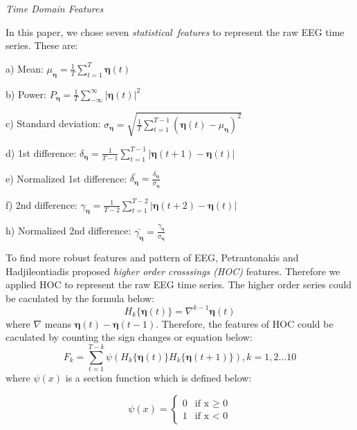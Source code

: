 \documentclass[runningheads,a4paper]{llncs}
\begin{document}
\emph{Time Domain Features}

In this paper, we chose seven \emph{statistical\ features} to represent the
raw EEG time series. These are:

a) Mean: ${\mu}_{\bm{\eta}} = \frac{1}{T}\sum_{t=1}^T \bm{\eta}(t)$

b) Power: $P_{\bm{\eta}} = \frac{1}{T}\sum_{-\infty}^{\infty} |{\bm{\eta}}(t)|^2 $

c) Standard deviation: $\sigma_{\bm{\eta}} = \sqrt{ \frac{1}{T} \sum_{t=1}^{T-1} ({\bm{\eta}}(t) - {\mu}_{\bm{\eta}})^2 }$

d) 1st difference: $\delta_{\bm{\eta}} = \frac{1}{T-1}\sum_{t=1}^{T-1}|{\bm{\eta}}(t+1) - {\bm{\eta}}(t)|$

e) Normalized 1st difference: $ \bar{\delta_{\bm{\eta}}} = \frac{ \delta_{\bm{\eta}}}{\sigma_{\bm{\eta}}}$

f) 2nd difference: $\gamma_{\bm{\eta}} = \frac{1}{T-2}\sum_{t=1}^{T-2}|{\bm{\eta}}(t+2) - {\bm{\eta}}(t)|$

h) Normalized 2nd difference: $\bar{\gamma_{\bm{\eta}}} = \frac{\gamma_{\bm{\eta}}}{\sigma_{\bm{\eta}}}$

To find more robust features and pattern of EEG, Petrantonakis and Hadjileontiadis proposed
 \emph{higher order crosssings (HOC)} features\cite{HOC}. Therefore we applied HOC to represent the raw EEG time series.
The higher order series could be caculated by the formula below:
\begin{equation}
    H_k\{{\bm{\eta}}(t)\} = \nabla^{k-1}{\bm{\eta}}(t)
\end{equation}
where $\nabla$ means ${\bm{\eta}}(t) - {\bm{\eta}}(t-1)$. Therefore, the features
of HOC could be caculated by counting the sign changes or equation below:
\begin{equation}
  F_k = \sum_{t=1}^{T-k}\psi(H_k\{{\bm{\eta}}(t)\}H_k\{{\bm{\eta}}(t+1)\}), k = 1,2...10
\end{equation}
where $\psi(x)$ is a section function which is defined below:

\begin{equation}
   \psi(x)=
   \begin{cases}
   0 &\mbox{if x $\geq$ 0}\\
   1 &\mbox{if  x $<$ 0}
   \end{cases}
\end{equation}
\end{document}
